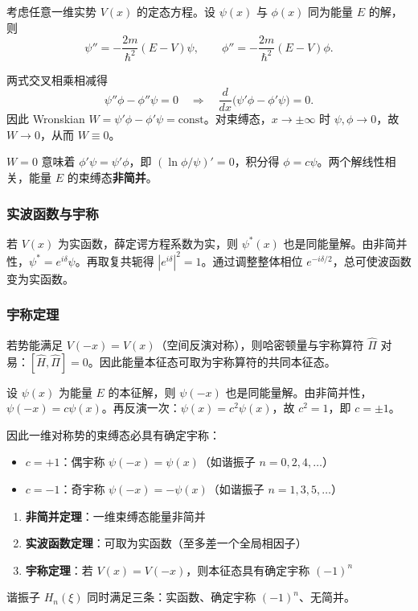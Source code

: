 考虑任意一维实势 $V(x)$ 的定态方程。设 $\psi(x)$ 与 $\phi(x)$ 同为能量 $E$ 的解，则
\[
\psi'' = -\frac{2m}{\hbar^2}(E-V)\psi,
\qquad
\phi'' = -\frac{2m}{\hbar^2}(E-V)\phi.
\]

两式交叉相乘相减得
\[
\psi''\phi - \phi''\psi = 0
\quad\Longrightarrow\quad
\frac{d}{dx}\bigl(\psi'\phi - \phi'\psi\bigr) = 0.
\]
因此 Wronskian $W = \psi'\phi - \phi'\psi = \text{const}$。对束缚态，$x\to\pm\infty$ 时 $\psi,\phi\to 0$，故 $W\to 0$，从而 $W\equiv 0$。

$W=0$ 意味着 $\phi'\psi = \psi'\phi$，即 $(\ln\phi/\psi)'=0$，积分得 $\phi = c\psi$。两个解线性相关，能量 $E$ 的束缚态\textbf{非简并}。

\subsubsection{实波函数与宇称}

若 $V(x)$ 为实函数，薛定谔方程系数为实，则 $\psi^*(x)$ 也是同能量解。由非简并性，$\psi^* = e^{i\delta}\psi$。再取复共轭得 $|e^{i\delta}|^2=1$。通过调整整体相位 $e^{-i\delta/2}$，总可使波函数变为实函数。

\subsubsection{宇称定理}

若势能满足 $V(-x)=V(x)$（空间反演对称），则哈密顿量与宇称算符 $\hat{\Pi}$ 对易：$[\hat{H},\hat{\Pi}]=0$。因此能量本征态可取为宇称算符的共同本征态。

设 $\psi(x)$ 为能量 $E$ 的本征解，则 $\psi(-x)$ 也是同能量解。由非简并性，$\psi(-x)=c\psi(x)$。再反演一次：$\psi(x)=c^2\psi(x)$，故 $c^2=1$，即 $c=\pm 1$。

因此一维对称势的束缚态必具有确定宇称：
\begin{itemize}[nosep]
    \item $c=+1$：偶宇称 $\psi(-x)=\psi(x)$（如谐振子 $n=0,2,4,\dots$）
    \item $c=-1$：奇宇称 $\psi(-x)=-\psi(x)$（如谐振子 $n=1,3,5,\dots$）
\end{itemize}

\begin{formulabox}[一维束缚态三大定理]
\begin{enumerate}
    \item \textbf{非简并定理}：一维束缚态能量非简并
    \item \textbf{实波函数定理}：可取为实函数（至多差一个全局相因子）
    \item \textbf{宇称定理}：若 $V(x)=V(-x)$，则本征态具有确定宇称 $(-1)^n$
\end{enumerate}
谐振子 $H_n(\xi)$ 同时满足三条：实函数、确定宇称 $(-1)^n$、无简并。
\end{formulabox}

